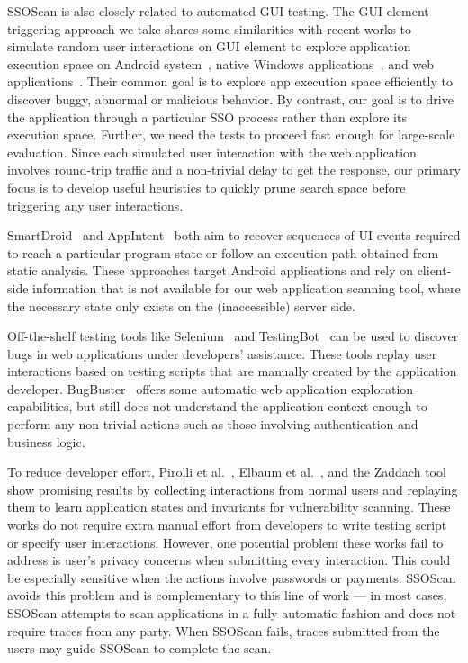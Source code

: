  SSOScan is also closely related to automated GUI testing.  The GUI element triggering approach we take shares some similarities with recent works to simulate random user interactions on GUI element to explore application execution space on Android system~\cite{Rastogi:2013:AAS:2435349.2435379}, native Windows applications~\cite{Xie:2006:MTC:1172962.1172990}, and web applications~\cite{Benedikt02veriweb:automatically,Huang:2003:WAS:775152.775174}.  Their common goal is to explore app execution space efficiently to discover buggy, abnormal or malicious behavior.  By contrast, our goal is to drive the application through a particular SSO process rather than explore its execution space.  Further, we need the tests to proceed fast enough for large-scale evaluation.  Since each simulated user interaction with the web application involves round-trip traffic and a non-trivial delay to get the response, our primary focus is to develop useful heuristics to quickly prune search space before triggering any user interactions.

SmartDroid~\cite{Zheng:2012:SAS:2381934.2381950} and AppIntent~\cite{Yang:2013:AAS:2541806.2516676} both aim to recover sequences of UI events required to reach a particular program state or follow an execution path obtained from static analysis.  These approaches target Android applications and rely on client-side information that is not available for our web application scanning tool, where the necessary state only exists on the (inaccessible) server side.

 Off-the-shelf testing tools like Selenium~\cite{Selenium} and TestingBot~\cite{TestingBot} can be used to discover bugs in web applications under developers' assistance.  These tools replay user interactions based on testing scripts that are manually created by the application developer.  BugBuster~\cite{BugBuster} offers some automatic web application exploration capabilities, but still does not understand the application context enough to perform any non-trivial actions such as those involving authentication and business logic.

To reduce developer effort, Pirolli et al.~\cite{Pirolli:2002:UAM:1556262.1556272}, Elbaum et al.~\cite{Elbaum:2003:IWA:776816.776823}, and the Zaddach tool~\cite{zaddach:ndss14} show promising results by collecting interactions from normal users and replaying them to learn application states and invariants for vulnerability scanning.  These works do not require extra manual effort from developers to write testing script or specify user interactions.  However, one potential problem these works fail to address is user's privacy concerns when submitting every interaction.  This could be especially sensitive when the actions involve passwords or payments.  SSOScan avoids this problem and is complementary to this line of work --- in most cases, SSOScan attempts to scan applications in a fully automatic fashion and does not require traces from any party.  When SSOScan fails, traces submitted from the users may guide SSOScan to complete the scan.

